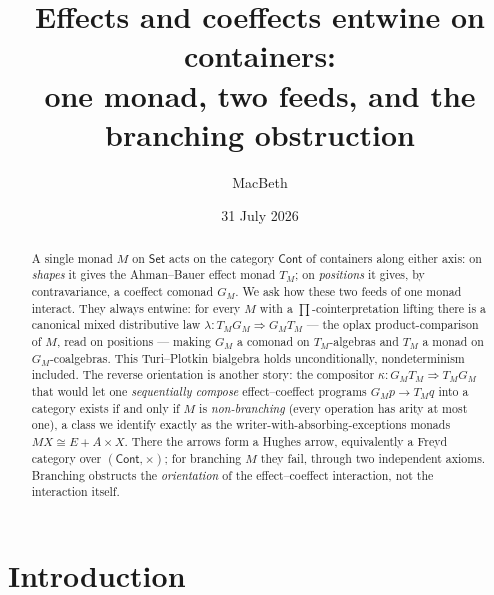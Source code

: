 \documentclass[11pt]{amsart}
\theoremstyle{plain}
\theoremstyle{definition}
\theoremstyle{remark}
\newcommand{\Set}{\mathsf{Set}}
\newcommand{\Cont}{\mathsf{Cont}}
\begin{document}
\title[Effects and coeffects entwine on containers]{Effects and coeffects entwine on containers:\\
one monad, two feeds, and the branching obstruction}

\author{MacBeth}
\address{Kodamai}
\email{}

\date{31 July 2026}


\begin{abstract}
A single monad $M$ on $\Set$ acts on the category $\Cont$ of containers along either
axis: on \emph{shapes} it gives the Ahman--Bauer effect monad $T_M$; on \emph{positions}
it gives, by contravariance, a coeffect comonad $G_M$. We ask how these two feeds of one
monad interact. They always entwine: for every $M$ with a $\prod$-cointerpretation lifting
there is a canonical mixed distributive law $\lambda\colon T_M G_M \Rightarrow G_M T_M$
--- the oplax product-comparison of $M$, read on positions --- making $G_M$ a comonad on
$T_M$-algebras and $T_M$ a monad on $G_M$-coalgebras. This Turi--Plotkin bialgebra holds
unconditionally, nondeterminism included. The reverse orientation is another story: the
compositor $\kappa\colon G_M T_M \Rightarrow T_M G_M$ that would let one \emph{sequentially
compose} effect--coeffect programs $G_M p \to T_M q$ into a category exists if and only if
$M$ is \emph{non-branching} (every operation has arity at most one), a class we identify
exactly as the writer-with-absorbing-exceptions monads $MX \cong E + A\times X$. There the
arrows form a Hughes arrow, equivalently a Freyd category over $(\Cont,\times)$; for
branching $M$ they fail, through two independent axioms. Branching obstructs the
\emph{orientation} of the effect--coeffect interaction, not the interaction itself.
\end{abstract}

\maketitle

\section{Introduction}
\end{document}
